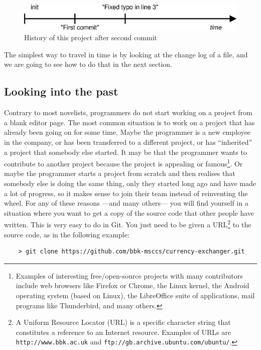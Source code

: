 \begin{figure}[htbp!]
  \centering
  \includegraphics[width=\textwidth]{gfx/commit_history_2.eps}
  \caption{History of this project after second commit}
  \label{fig:git-example-2}
\end{figure}

The simplest way to travel in time is by looking at the change log of
a file, and we are going to see how to do that in the next section. 

\subsection{Looking into the past}
\label{sec:looking-into-past}

Contrary to most novelists, programmers do not start working on a
project from a blank editor page. The most common situation is to work
on a project that has already been going on for some time. Maybe the
programmer is a new employee in the company, or has been transferred
to a different project, or has ``inherited'' a project that somebody
else started. It may be that the programmer wants to contribute to
another project because the project is appealing or
famous\footnote{Examples of interesting free/open-source projects with
  many contributors include web browsers like Firefox or Chrome, the
  Linux kernel, the Android operating system (based on Linux), the
  LibreOffice suite of applications, mail programs 
  like Thunderbird, and many others.}. Or maybe the programmer starts a
project from scratch and then realises that somebody else is doing the
same thing, only they started long ago and have made a lot of
progress, so it makes sense to join their team instead of reinventing
the wheel. For any of these reasons ---and many others--- you will
find yourself in a situation where you want to get a copy of the
source code that other people have written. This is very easy to do in
Git. You just need to be given a URL\footnote{A Uniform
  Resource Locator (URL) is a specific character string that
  constitutes a reference to an Internet resource. Examples of URLs
  are \texttt{http://www.bbk.ac.uk} and
  \texttt{ftp://gb.archive.ubuntu.com/ubuntu/}.
} to the source code, as
in the following example:

\begin{verbatim}
    > git clone https://github.com/bbk-msccs/currency-exchanger.git
\end{verbatim}

